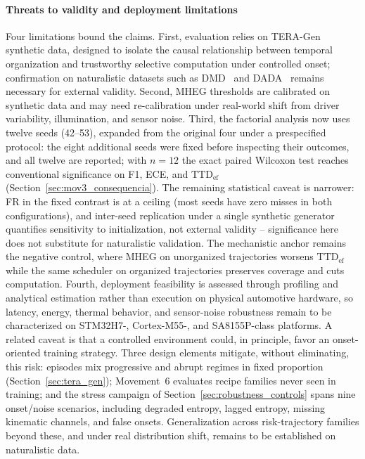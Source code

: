 \documentclass[a4paper,fleqn]{cas-dc}
\newcommand{\TERAGen}{\mbox{TERA-Gen}\xspace}
\newcommand{\MHEG}{\mbox{MHEG}\xspace}
\begin{document}
\paragraph{Threats to validity and deployment limitations}
\label{sec:limitations}
Four limitations bound the claims. First, evaluation relies on \TERAGen
synthetic data, designed to isolate the causal relationship between temporal
organization and trustworthy selective computation under controlled onset;
confirmation on naturalistic datasets such as DMD~\cite{ortega2020dmd} and
DADA~\cite{fang2022dada} remains necessary for external validity. Second, \MHEG
thresholds are calibrated on synthetic data and may need re-calibration under
real-world shift from driver variability, illumination, and sensor noise.
{\color{\revcolor}Third, the factorial analysis now uses twelve seeds (42--53),
expanded from the original four under a prespecified protocol: the eight
additional seeds were fixed before inspecting their outcomes, and all twelve
are reported; with $n=12$ the exact paired
Wilcoxon test reaches conventional significance on F1, ECE, and
$\mathrm{TTD}_{\mathrm{ef}}$ (Section~\ref{sec:mov3_consequencia}). The
remaining statistical caveat is narrower: FR in the fixed contrast is at a
ceiling (most seeds have zero misses in both configurations), and inter-seed
replication under a single synthetic generator quantifies sensitivity to
initialization, not external validity -- significance here does not substitute
for naturalistic validation. The mechanistic anchor remains the negative
control, where \MHEG on unorganized trajectories worsens
$\mathrm{TTD}_{\mathrm{ef}}$ while the same scheduler on organized
trajectories preserves coverage and cuts computation.} Fourth, deployment feasibility is assessed through profiling and
analytical estimation rather than execution on physical automotive hardware, so
latency, energy, thermal behavior, and sensor-noise robustness remain to be
characterized on STM32H7-, Cortex-M55-, and SA8155P-class platforms.
{\color{\revcolor}A related caveat is that a controlled environment could, in
principle, favor an onset-oriented training strategy. Three design elements
mitigate, without eliminating, this risk: episodes mix progressive and abrupt
regimes in fixed proportion (Section~\ref{sec:tera_gen}); Movement~6 evaluates
recipe families never seen in training; and the stress campaign of
Section~\ref{sec:robustness_controls} spans nine onset/noise scenarios,
including degraded entropy, lagged entropy, missing kinematic channels, and
false onsets. Generalization across risk-trajectory families beyond these, and
under real distribution shift, remains to be established on naturalistic
data.}
\end{document}
